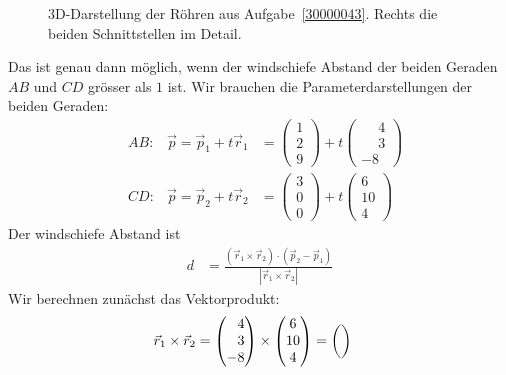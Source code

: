 \begin{loesung}
\begin{figure}
\caption{3D-Darstellung der Röhren aus Aufgabe~\ref{30000043}.
Rechts die beiden Schnittstellen im Detail.
\label{30000043:tubes}}
\end{figure}
Das ist genau dann möglich, wenn der windschiefe Abstand der beiden
Geraden $AB$ und $CD$ grösser als $1$ ist.
Wir brauchen die Parameterdarstellungen der beiden Geraden:
\[
\begin{aligned}
&AB:&\vec{p}=\vec{p}_1+t\vec{r}_1
&=
\begin{pmatrix}1\\2\\9\end{pmatrix} + t\begin{pmatrix}\phantom{-}4\\\phantom{-}3\\-8\end{pmatrix}
\\
&CD:&\vec{p}=\vec{p}_2+t\vec{r}_2
&=
\begin{pmatrix}3\\0\\0\end{pmatrix} + t\begin{pmatrix}6\\10\\4\end{pmatrix}
\end{aligned}
\]
Der windschiefe Abstand ist
\begin{align*}
d
&=
\frac{(\vec{r}_1\times\vec{r}_2)\cdot (\vec{p}_2 - \vec{p}_1)}{|\vec{r}_1\times \vec{r}_2|}
\end{align*}
Wir berechnen zunächst das Vektorprodukt:
\begin{align*}
\vec{r}_1\times \vec{r}_2
&=
\begin{pmatrix}\phantom{-}4\\\phantom{-}3\\-8\end{pmatrix}
\times
\begin{pmatrix}6\\10\\4\end{pmatrix}
=
{\def\arraystretch{2.2}
\begin{pmatrix}
{\def\arraystretch{1.0}
}
\end{pmatrix}}
\end{align*}
\end{loesung}
